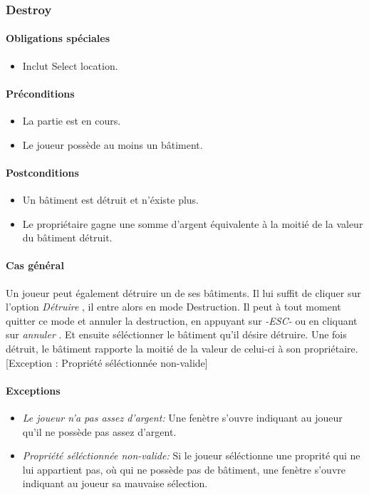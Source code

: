 \documentclass[a4paper,11pt]{report}
\begin{document}
\subsubsection{Destroy}
\paragraph{Obligations spéciales}
\begin{itemize}
 \item Inclut Select location.
\end{itemize}
\paragraph{Préconditions}
\begin{itemize}
 \item La partie est en cours.
 \item Le joueur possède au moins un bâtiment.
\end{itemize}
\paragraph{Postconditions}
\begin{itemize}
 \item Un bâtiment est détruit et n'éxiste plus.
 \item Le propriétaire gagne une somme d'argent équivalente à la moitié de la valeur du bâtiment détruit.
\end{itemize}
\paragraph{Cas général}
Un joueur peut également détruire un de ses bâtiments. Il lui suffit de cliquer sur l'option \og \textit{Détruire} \fg, il entre alors en mode Destruction. Il peut à tout moment quitter ce mode et annuler la destruction, en appuyant sur \og \textit{-ESC-} \fg ou en cliquant sur \og \textit{annuler} \fg. Et ensuite séléctionner le bâtiment qu'il désire détruire. Une fois détruit, le bâtiment rapporte la moitié de la valeur de celui-ci à son propriétaire. [Exception : Propriété séléctionnée non-valide]
\paragraph{Exceptions}
\begin{itemize}
 \item \textit{Le joueur n'a pas assez d'argent:}  Une fenètre s'ouvre indiquant au joueur qu'il ne possède pas assez d'argent.
  \item \textit{Propriété séléctionnée non-valide:}  Si le joueur séléctionne une proprité qui ne lui appartient pas, où qui ne possède pas de bâtiment, une fenètre s'ouvre indiquant au joueur sa mauvaise sélection.
\end{itemize}
\end{document}
